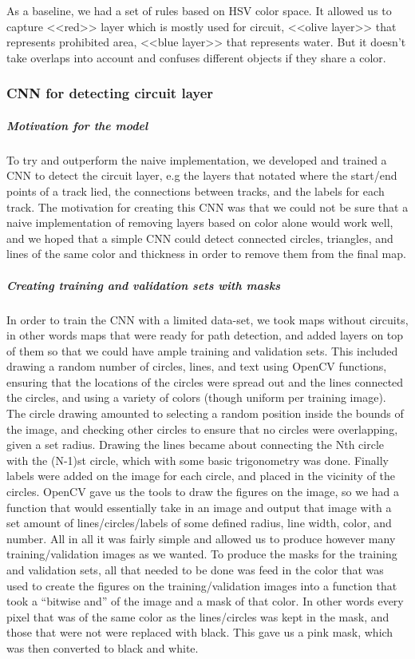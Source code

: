 \documentclass[a4paper,12pt]{extarticle}
\begin{document}
As a baseline, we had a set of rules based on HSV color space.
It allowed us to capture <<red>> layer which is mostly used for circuit, <<olive layer>> that represents prohibited area, <<blue layer>> that represents water.
But it doesn't take overlaps into account and confuses different objects if they share a color.

\subsubsection{CNN for detecting circuit layer}
\subparagraph{Motivation for the model\\}

To try and outperform the naive implementation, we developed and trained a CNN \cite{cnn} to detect the circuit layer, e.g the layers that notated where the start/end points of a track lied, the connections between tracks, and the labels for each track.
The motivation for creating this CNN was that we could not be sure that a naive implementation of removing layers based on color alone would work well, and we hoped that a simple CNN could detect connected circles, triangles, and lines of the same color and thickness in order to remove them from the final map. 

\subparagraph{Creating training and validation sets with masks\\}

In order to train the CNN with a limited data-set, we took maps without circuits, in other words maps that were ready for path detection, and added layers on top of them so that we could have ample training and validation sets. This included drawing a random number of circles, lines, and text using OpenCV functions, ensuring that the locations of the circles were spread out and the lines connected the circles, and using a variety of colors (though uniform per training image). The circle drawing amounted to selecting a random position inside the bounds of the image, and checking other circles to ensure that no circles were overlapping, given a set radius. Drawing the lines became about connecting the Nth circle with the (N-1)st circle, which with some basic trigonometry was done. Finally labels were added on the image for each circle, and placed in the vicinity of the circles. OpenCV gave us the tools to draw the figures on the image, so we had a function that would essentially take in an image and output that image with a set amount of lines/circles/labels of some defined radius, line width, color, and number. All in all it was fairly simple and allowed us to produce however many training/validation images as we wanted. To produce the masks for the training and validation sets, all that needed to be done was feed in the color that was used to create the figures on the training/validation images into a function that took a “bitwise and” of the image and a mask of that color. In other words every pixel that was of the same color as the lines/circles was kept in the mask, and those that were not were replaced with black. This gave us a pink mask, which was then converted to black and white.
\end{document}

